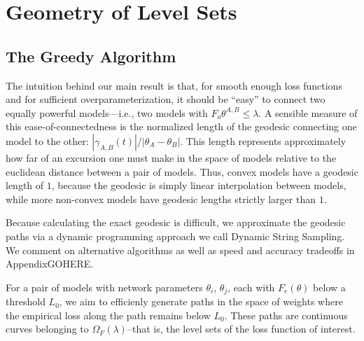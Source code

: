 

\section{Geometry of Level Sets}
\label{sec:QuanNoncon}

\subsection{The Greedy Algorithm}
\label{sec:GreedyAlg}
 
 The intuition behind our main result is that, for smooth enough loss functions and for sufficient overparameterization, it should be ``easy'' to connect two equally powerful models---i.e., two models with $F_o{\theta^{A,B}} \leq \lambda$.  A sensible measure of this ease-of-connectedness is the normalized length of the geodesic connecting one model to the other: $|\gamma_{A,B}(t)| / |\theta_A - \theta_B|$.  This length represents approximately how far of an excursion one must make in the space of models relative to the euclidean distance between a pair of models.  Thus, convex models have a geodesic length of $1$, because the geodesic is simply linear interpolation between models, while more non-convex models have geodesic lengths strictly larger than $1$.
 
 Because calculating the exact geodesic is difficult, we approximate the geodesic paths via a dynamic programming approach we call Dynamic String Sampling.  We comment on alternative algorithms as well as speed and accuracy tradeoffs in AppendixGOHERE.
 
 For a pair of models with network parameters $\theta_i$, $\theta_j$, each with $F_e(\theta)$ below a threshold $L_0$, we aim to efficienly generate paths in the space of weights where the empirical loss along the path remains below $L_0$.  These paths are continuous curves belonging to $\Omega_F(\lambda)$--that is, the level sets of the loss function of interest.

